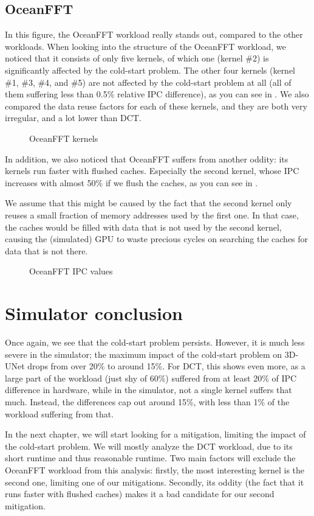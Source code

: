 \subsection{OceanFFT}\label{subsec:oceanfft}
In this figure, the OceanFFT workload really stands out, compared to the other workloads.
When looking into the structure of the OceanFFT workload, we noticed that it consists of only five kernels, of which one (kernel \#2) is significantly affected by the cold-start problem.
The other four kernels (kernel \#1, \#3, \#4, and \#5) are not affected by the cold-start problem at all (all of them suffering less than 0.5\% relative IPC difference), as you can see in .
We also compared the data reuse factors for each of these kernels, and they are both very irregular, and a lot lower than DCT\@.

\begin{figure}[ht]
    \centering
    \caption{OceanFFT kernels}
    \label{fig:ocean_kernels}
\end{figure}

In addition, we also noticed that OceanFFT suffers from another oddity: its kernels run faster with flushed caches.
Especially the second kernel, whose IPC increases with almost 50\% if we flush the caches, as you can see in .

We assume that this might be caused by the fact that the second kernel only reuses a small fraction of memory addresses used by the first one.
In that case, the caches would be filled with data that is not used by the second kernel, causing the (simulated) GPU to waste precious cycles on searching the caches for data that is not there.

\begin{figure}[ht]
    \centering
    \caption{OceanFFT IPC values}
    \label{fig:ocean_issue}
\end{figure}


\FloatBarrier
\section{Simulator conclusion}\label{sec:simulator-conclusion}
Once again, we see that the cold-start problem persists.
However, it is much less severe in the simulator; the maximum impact of the cold-start problem on 3D-UNet drops from over 20\% to around 15\%.
For DCT, this shows even more, as a large part of the workload (just shy of 60\%) suffered from at least 20\% of IPC difference in hardware, while in the simulator, not a single kernel suffers that much.
Instead, the differences cap out around 15\%, with less than 1\% of the workload suffering from that.

In the next chapter, we will start looking for a mitigation, limiting the impact of the cold-start problem.
We will mostly analyze the DCT workload, due to its short runtime and thus reasonable runtime.
Two main factors will exclude the OceanFFT workload from this analysis: firstly, the most interesting kernel is the second one, limiting one of our mitigations.
Secondly, its oddity (the fact that it runs faster with flushed caches) makes it a bad candidate for our second mitigation.